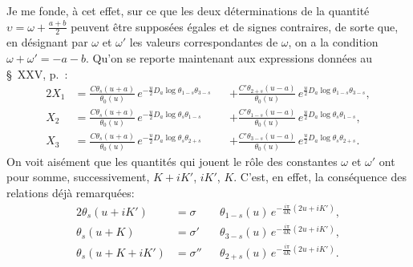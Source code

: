 \documentclass[11pt,leqno,oneside,letterpaper]{book}[2005/09/16]
\begin{document}
Je me fonde, \`a cet effet, sur ce que les deux d\'eterminations de la
quantit\'e $\upsilon = \omega + \frac{a+b}{2}$ peuvent \^etre suppos\'ees \'egales et de signes contraires,
de sorte que, en d\'esignant par $\omega$ et $\omega'$ les valeurs correspondantes
de $\omega$, on a la condition $\omega + \omega' = -a-b$. Qu'on se reporte maintenant
aux expressions donn\'ees au \S~XXV, p.~\pageref{page69}:
\begin{alignat*}{2}
X_1 &= \frac{C \theta_s    (u+a)}{\theta_0(u)}\, e^{-\frac{u}{2}D_a \log \theta_{1-s} \theta_{3-s}}
&&     + \frac{C'\theta_{2+s}(u-a)}{\theta_0(u)}\, e^{ \frac{u}{2}D_a \log \theta_{1-s} \theta_{3-s}}, \\
X_2 &= \frac{C \theta_s    (u+a)}{\theta_0(u)}\, e^{-\frac{u}{2}D_a \log \theta_s     \theta_{1-s}}
&&     + \frac{C'\theta_{1-s}(u-a)}{\theta_0(u)}\, e^{ \frac{u}{2}D_a \log \theta_s     \theta_{1-s}}, \\
X_3 &= \frac{C \theta_s    (u+a)}{\theta_0(u)}\, e^{-\frac{u}{2}D_a \log \theta_s     \theta_{2+s}}
&&     + \frac{C'\theta_{3-s}(u-a)}{\theta_0(u)}\, e^{ \frac{u}{2}D_a \log \theta_s     \theta_{2+s}}.
\end{alignat*}
On voit ais\'ement que les quantit\'es qui jouent le r\^ole des constantes $\omega$ et $\omega'$
ont pour somme, successivement, $K + iK'$, $iK'$, $K$. C'est, en effet, la cons\'equence
des relations d\'ej\`a remarqu\'ees:
\begin{alignat*}{2}
\theta_s(u + iK') &= \sigma  &&\theta_{1-s}(u)\,
  e^{-\frac{i\pi}{4K}(2u+iK')},\\
\theta_s(u +  K ) &= \sigma' &&\theta_{3-s}(u)\,
  e^{-\frac{i\pi}{4K}(2u+iK')},\\
\theta_s(u+K+iK') &= \sigma'' &&\theta_{2+s}(u)\,
  e^{-\frac{i\pi}{4K}(2u+iK')}.
\end{alignat*}
\end{document}
